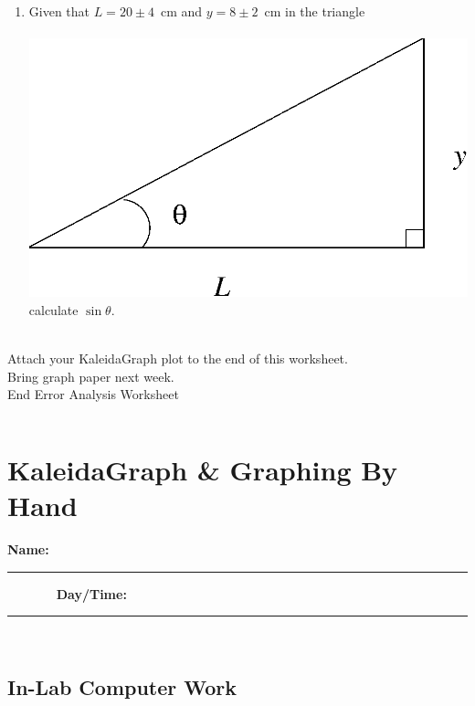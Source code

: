 \begin{enumerate}
\item Given that $L=20\pm 4$~cm and $y=8\pm 2$~cm in the triangle\\
\vspace*{2mm}\\
\hspace*{4cm} \epsfxsize=5cm \includegraphics[scale=0.5]{0_intro/triangle.eps}\\
calculate $\sin\theta$. \\
\vspace*{3cm} \\
\end{enumerate}
\vfill
\noindent Attach your KaleidaGraph plot to the end of this worksheet. \\
{\Large Bring graph paper next week.} \\
{\Large End Error Analysis Worksheet}


\pagebreak
$$
$$
\vfill
\clearpage
\newpage

\renewcommand{\thesection}{\thechapter.W2}

\section{KaleidaGraph \& Graphing By Hand}
{\bf \Large Name:}~ \rule{5cm}{.1mm}~~~~~~~
{\bf \Large Day/Time:}~\rule{3cm}{.1mm}\\
\label{sec:ea:graph}
\subsection{In-Lab Computer Work}
